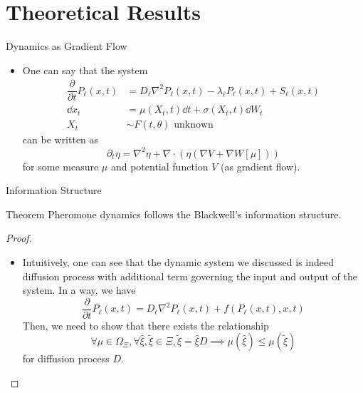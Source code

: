 \documentclass[10pt]{beamer}
\begin{document}
\section{Theoretical Results}
\begin{frame}{Dynamics as Gradient Flow}
    \begin{itemize}
        \item One can say that the system
        \begin{align}
    \dfrac{\partial}{\partial t} P_\ell(x,t) &= D_\ell \nabla^2P_\ell(x,t) -\lambda_\ell P_\ell(x,t) +S_\ell(x,t)\\
    \dd x_t &= \mu(X_t,t)\dd t + \sigma(X_t,t)\dd W_t\\
    X_t &\sim F(t,\theta) \text{ unknown}
    \end{align}
    can be written as
    \begin{equation}
        \partial_t\eta = \nabla^2\eta + \nabla \cdot \left(\eta (\nabla V+ \nabla W[\mu])\right)
    \end{equation}
    for some measure $\mu$ and potential function $V$ (as gradient flow).
    \end{itemize}
\end{frame}
\begin{frame}{Information Structure}
    \begin{block}{Theorem}
    Pheromone dynamics follows the Blackwell's information structure. 
    \end{block}
    \begin{proof}
        \begin{itemize}
            \item Intuitively, one can see that the dynamic system we discussed is indeed diffusion process with additional term governing the input and output of the system. In a way, we have
            \[
            \dfrac{\partial}{\partial t} P_\ell(x,t) = D_\ell \nabla^2P_\ell(x,t) + f(P_\ell(x,t),x,t)
             \]
            Then, we need to show that there exists the relationship
            \[
            \forall \mu \in \Omega_{\Xi}, \forall\hat{\xi},\tilde{\xi}\in \Xi, \tilde{\xi} = \hat{\xi}D \implies \mu(\hat{\xi}) \leq \mu(\tilde{\xi})
            \]
            for diffusion process $D$.
        \end{itemize}
    \end{proof}
\end{frame}
\end{document}
